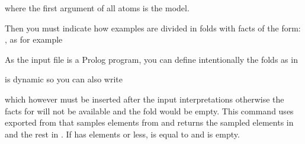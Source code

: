 \documentclass[letterpaper,10pt,english]{sphinxmanual}
\begin{document}
where the first argument of all atoms is the model.

Then you must indicate how examples are divided in folds with facts of the form: , as for example

%
\begin{sphinxVerbatim}[commandchars=\\\{\}]
\PYG{p}{[}\PYG{p}{]}
\PYG{p}{[}\PYG{p}{]}
\end{sphinxVerbatim}

As the input file is a Prolog program, you can define intentionally the folds as in

%
\begin{sphinxVerbatim}[commandchars=\\\{\}]
\end{sphinxVerbatim}

 is dynamic so you can also write

%
\begin{sphinxVerbatim}[commandchars=\\\{\}]
 
\end{sphinxVerbatim}

which however must be inserted after the input interpretations otherwise the facts for  will not be available and the fold  would be empty.
This command uses  exported from  that samples  elements from  and returns the sampled elements in  and the rest in .
If  has  elements or less,  is equal to  and  is empty.
\end{document}
